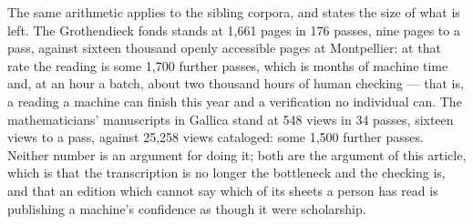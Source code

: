 The same arithmetic applies to the sibling corpora, and states the size of what
is left. The Grothendieck fonds stands at 1,661 pages in 176 passes, nine pages
to a pass, against sixteen thousand openly accessible pages at Montpellier: at
that rate the reading is some 1,700 further passes, which is months of machine
time and, at an hour a batch, about two thousand hours of human checking ---
that is, a reading a machine can finish this year and a verification no
individual can. The mathematicians' manuscripts in Gallica stand at 548 views
in 34 passes, sixteen views to a pass, against 25,258 views cataloged: some
1,500 further passes. Neither number is an argument for doing it; both are the
argument of this article, which is that the transcription is no longer the
bottleneck and the checking is, and that an edition which cannot say which of
its sheets a person has read is publishing a machine's confidence as though it
were scholarship.
